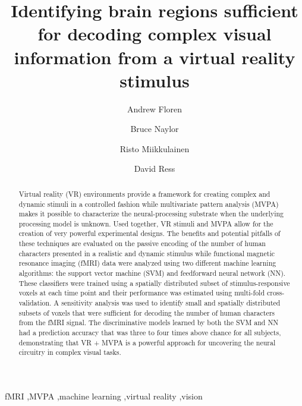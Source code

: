 \documentclass[preprint,5p,authoryear]{elsarticle}
\begin{document}
\begin{frontmatter}

\title{Identifying brain regions sufficient for decoding complex visual information from a virtual reality stimulus}

\author[ECE,NS]{Andrew Floren}

\author[NS]{Bruce Naylor}

\author[CS]{Risto Miikkulainen}

\author[BCM]{David Ress}

\address[ECE]{Department of Electrical and Computer Engineering}
\address[NS]{Department of Neuroscience}
\address[CS]{Computer Science Department \\ The University of Texas at Austin, Austin, TX 78712 USA}
\address[BCM]{Department of Neuroscience \\ Baylor College of Medicine, Houston, TX 77030 USA}


\begin{abstract}
Virtual reality (VR) environments provide a framework for creating complex and dynamic stimuli in a controlled fashion while multivariate pattern analysis (MVPA) makes it possible to characterize the neural-processing substrate when the underlying processing model is unknown. 
Used together, VR stimuli and MVPA allow for the creation of very powerful experimental designs. 
The benefits and potential pitfalls of these techniques are evaluated on the passive encoding of the number of human characters presented in a realistic and dynamic stimulus while functional magnetic resonance imaging (fMRI) data were analyzed using two different machine learning algorithms: the support vector machine (SVM) and feedforward neural network (NN). 
These classifiers were trained using a spatially distributed subset of stimulus-responsive voxels at each time point and their performance was estimated using multi-fold cross-validation.
A sensitivity analysis was used to identify small and spatially distributed subsets of voxels that were sufficient for decoding the number of human characters from the fMRI signal.
The discriminative models learned by both the SVM and NN had a prediction accuracy that was three to four times above chance for all subjects, demonstrating that VR + MVPA is a powerful approach for uncovering the neural circuitry in complex visual tasks.
\end{abstract}

\begin{keyword}
fMRI \sep MVPA \sep machine learning \sep virtual reality \sep vision
\end{keyword}

\end{frontmatter}
\end{document}
